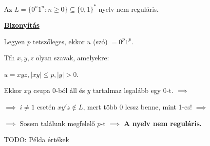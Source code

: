 \documentclass[10pt]{article}
\renewcommand{\\}{\par\noindent}
\begin{document}
\begin{frame}
\begin{tcolorbox}[title={Tétel: Példa nemreguláris nyelvre}]
Az $L = \{0^n1^n : n \geq 0\} \subseteq \{0, 1\}^*$ nyelv nem reguláris.\\
\tcblower
\smallskip
\underline{\textbf{Bizonyítás}}\\
\medskip
\\
Legyen $p$  tetszőleges, ekkor $u$ (szó) $ = 0^p1^p$.\\
Tfh $x, y, z$ olyan szavak, amelyekre:\\
$u = xyz, |xy| \leq p, |y| > 0$.\\
\bigskip
Ekkor $xy$ csupa 0-ból áll és $y$ tartalmaz legalább egy 0-t. $\implies$\\
$\implies$ $i \neq 1$ esetén $xy'z \notin L$, mert több 0 lessz benne, mint 1-es! $\implies$\\
$\implies$ Sosem találunk megfelelő $p$-t $\implies$ \textbf{A nyelv nem reguláris.}\\
\bigskip
TODO: Példa értékek
\end{tcolorbox}

\end{frame}
\end{document}
